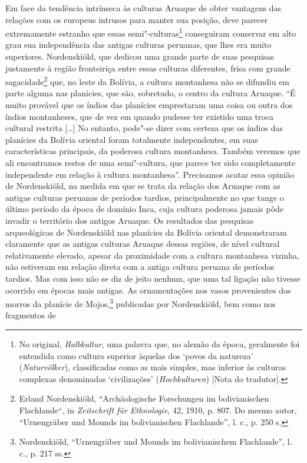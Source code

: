 Em face da tendência intrínseca às culturas Aruaque de obter vantagens
das relações com os europeus intrusos para manter sua posição, deve
parecer extremamente estranho que essas semi"-culturas\footnote[*]{No original,
  \emph{Halbkultur}, uma palavra que, no alemão da época, geralmente
  foi entendida como cultura superior àquelas dos `povos da natureza'
  (\emph{Naturvölker}), classificadas como as mais simples, mas inferior
  às culturas complexas denominadas `civilizações' (\emph{Hochkulturen})
  {[}Nota do tradutor{]}.} conseguiram
conservar em alto grau sua independência das antigas culturas peruanas,
que lhes era muito superiores. Nordenskiöld, que dedicou uma grande
parte de suas pesquisas justamente à região fronteiriça entre essas
culturas diferentes, frisa com grande sagacidade\footnote{Erland Nordenskiöld, ``Archäologische Forschungen im bolivianischen
  Flachlande``, in \emph{Zeitschrift für Ethnologie}, 42, 1910, p. 807.
  Do mesmo autor, ``Urnengräber und Mounds im bolivianischen
  Flachlande'', l. c., p. 250 s.} que, no leste da Bolívia, a cultura
montanhesa não se difundiu em parte alguma nas planícies, que são,
sobretudo, o centro da cultura Aruaque. ``É muito provável que os índios
das planícies emprestaram uma coisa ou outra dos índios montanheses,
que de vez em quando pudesse ter existido uma troca cultural restrita
{[}\ldots{}{]} No entanto, pode"-se dizer com certeza que os índios das
planícies da Bolívia oriental foram totalmente independentes, em suas
características principais, da poderosa cultura montanhesa. Também
veremos que ali encontramos restos de uma semi"-cultura, que parece ter
sido completamente independente em relação à cultura montanhesa''.
Precisamos acatar essa opinião de Nordenskiöld, na medida em que se
trata da relação dos Aruaque com as antigas culturas peruanas de
períodos tardios, principalmente no que tange o último período da época
de domínio Inca, cuja cultura poderosa jamais pôde invadir o território
dos antigos Aruaque. Os resultados das pesquisas arqueológicas de
Nordenskiöld nas planícies da Bolívia oriental demonstraram claramente
que as antigas culturas Aruaque dessas regiões, de nível cultural
relativamente elevado, apesar da proximidade com a cultura montanhesa
vizinha, não estiveram em relação direta com a antiga cultura peruana de
períodos tardios. Mas com isso não se diz de jeito nenhum, que uma tal
ligação não tivesse ocorrido em épocas mais antigas. As ornamentações
nos vasos provenientes dos morros da planície de Mojos,\footnote{Nordenskiöld,
  ``Urnengräber und Mounds im bolivianischem Flachlande'', l. c., p.
  217 ss.} publicadas por Nordenskiöld, bem como nos fragmentos de
